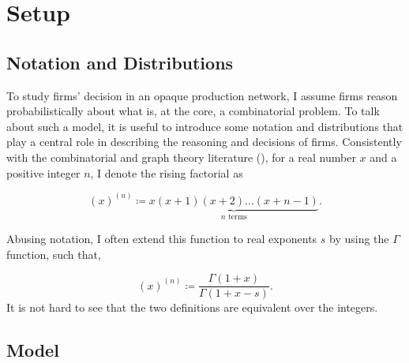 \documentclass[../../main.tex]{subfiles}
\begin{document}
\section{Setup}

\subsection{Notation and Distributions}

To study firms' decision in an opaque production network, I assume firms reason probabilistically about what is, at the core, a combinatorial problem. To talk about such a model, it is useful to introduce some notation and distributions that play a central role in describing the reasoning and decisions of firms. Consistently with the combinatorial and graph theory literature (\cite{harris_combinatorics_2008}), for a real number $x$ and a positive integer $n$, I  denote the rising factorial as

\begin{equation}
  (x)^{(n)} \coloneqq \underbrace{x(x + 1)(x + 2)\ldots(x + n - 1)}_{n \text{ terms}}.
\end{equation}

Abusing notation, I  often extend this function to real exponents $s$ by using the $\Gamma$ function, such that,

\begin{equation}
  (x)^{(n)} \coloneqq \frac{\Gamma(1 + x)}{\Gamma(1 + x - s)}.
\end{equation} It is not hard to see that the two definitions are equivalent over the integers.


\subsection{Model}
\end{document}
